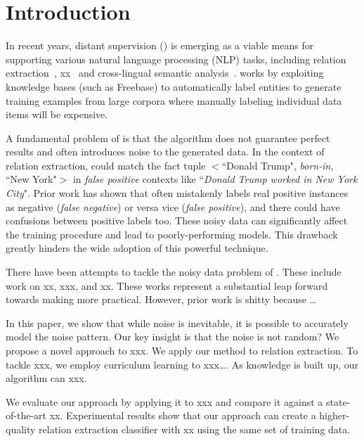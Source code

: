\section{Introduction}

In recent years, distant supervision (\DS) is emerging as a viable means for supporting various natural language
processing (NLP) tasks, including relation extraction~\cite{mintz2009distant}, xx~\cite{} and cross-lingual semantic
analysis~\cite{fang2016learning}. \DS works by exploiting knowledge bases (such as Freebase) to automatically label
entities to generate
training examples from large corpora where manually labeling individual data items will be expensive.


A fundamental problem of \DS is that the algorithm does not guarantee perfect results and often introduces noise to the
generated data. In the context of relation extraction, \DS could match the fact tuple $<$``Donald Trump",
\emph{born-in}, ``New York"$>$  in \emph{false positive} contexts like ``\emph{Donald Trump worked in New York City}".
Prior work has shown that \DS often mistakenly labels real positive instances as negative (\emph{false negative}) or
versa vice (\emph{false positive}), and there could have confusions between positive labels too. These noisy data can
significantly affect the training
procedure and lead to poorly-performing models. This drawback greatly hinders the wide adoption of this powerful technique. 

There have been attempts to tackle the noisy data problem of \DS. These
include work on xx, xxx, and xx. These works represent a substantial leap
forward towards making \DS more practical. However, prior work is shitty
because …

In this paper, we show that while noise is inevitable, it is possible to
accurately model the noise pattern. Our key insight is that the noise is not
random? We propose a novel approach to xxx. We apply our method to relation
extraction. To tackle xxx, we employ curriculum learning to xxx…. As
knowledge is built up, our algorithm can xxx.

We evaluate our approach by applying it to xxx and compare it against a
state-of-the-art xx. Experimental results show that our approach can create a
higher-quality relation extraction classifier with xx%
using the same set of training data.
